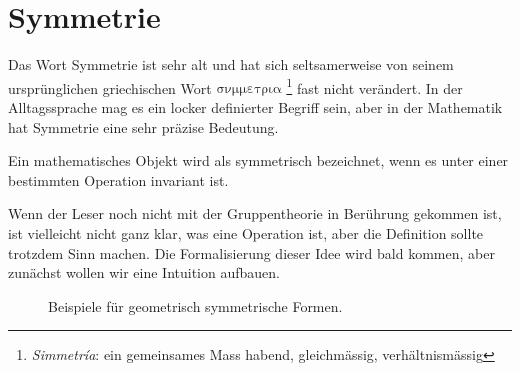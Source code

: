\section{Symmetrie}
Das Wort Symmetrie ist sehr alt und hat sich seltsamerweise von seinem
ursprünglichen griechischen Wort
\(\mathrm{\sigma\nu\mu\mu\varepsilon\tau\rho\iota\alpha}\)
\footnote{\emph{Simmetr\'ia}: ein gemeinsames Mass habend, gleichmässig,
verhältnismässig} fast nicht verändert. In der Alltagssprache mag es ein
locker definierter Begriff sein, aber in der Mathematik hat Symmetrie eine sehr
präzise Bedeutung.
\begin{definition}[Symmetrie]
	Ein mathematisches Objekt wird als symmetrisch bezeichnet, wenn es unter einer
	bestimmten Operation invariant ist.
\end{definition}

Wenn der Leser noch nicht mit der Gruppentheorie in Berührung gekommen ist, ist
vielleicht nicht ganz klar, was eine Operation ist, aber die Definition sollte
trotzdem Sinn machen. Die Formalisierung dieser Idee wird bald kommen, aber
zunächst wollen wir eine Intuition aufbauen.

\begin{figure}[h]
	\centering
	\caption{
		Beispiele für geometrisch symmetrische Formen.
		\label{fig:punktgruppen:geometry-example}
	}
\end{figure}

